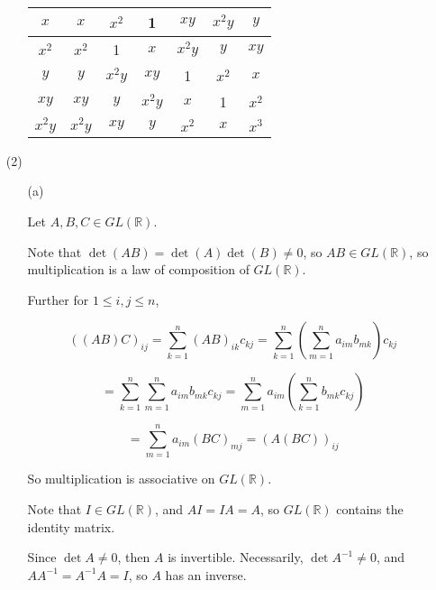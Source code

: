 \documentclass[12pt]{article}
\begin{document}
\begin{itemize}
\begin{itemize}
\begin{tabular}{| c || c | c | c | c | c | c |}
\hline

$x$ & $x$ & $x^2$ & 1 & $xy$ & $x^2y$ & $y$ \\

\hline

$x^2$ & $x^2$ & 1 & $x$ & $x^2y$ & $y$ & $xy$ \\

\hline

$y$ & $y$ & $x^2y$ & $xy$ & 1 & $x^2$ & $x$ \\

\hline

$xy$ & $xy$ & $y$ & $x^2y$ & $x$ & 1 & $x^2$ \\

\hline

$x^2y$ & $x^2y$ & $xy$ & $y$ & $x^2$ & $x$ & $x^3$ \\

\hline

\end{tabular}

\end{itemize}

\item[(2)]

\begin{itemize}

\item[(a)]

Let $A, B, C \in GL(\mathbb{R})$. 



Note that $\det(AB) = \det(A)\det(B) \neq 0$, so $AB \in GL(\mathbb{R})$, so multiplication is a law of composition of $GL(\mathbb{R})$.



Further for $1 \leq i,j \leq n$,

$$((AB)C)_{ij} = \sum_{k=1}^n (AB)_{ik}c_{kj} = \sum_{k=1}^n\left(\sum_{m=1}^n a_{im}b_{mk}\right)c_{kj} $$

$$= \sum_{k=1}^n\sum_{m=1}^n a_{im}b_{mk}c_{kj} = \sum_{m=1}^na_{im}\left(\sum_{k=1}^n b_{mk}c_{kj}\right)$$

$$= \sum_{m=1}^na_{im}(BC)_{mj} = (A(BC))_{ij}$$

So multiplication is associative on $GL(\mathbb{R})$.



Note that $I \in GL(\mathbb{R})$, and $AI = IA = A$, so $GL(\mathbb{R})$ contains the identity matrix.



Since $\det A \neq 0$, then $A$ is invertible. Necessarily, $\det A^{-1} \neq 0$, and $AA^{-1} = A^{-1}A = I$, so $A$ has an inverse. 




\end{itemize}
\end{itemize}
\end{document}
